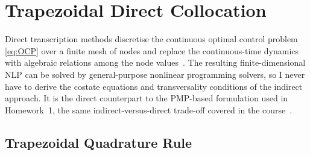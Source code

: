 \documentclass[../main.tex]{subfiles}
\begin{document}
\section{Trapezoidal Direct Collocation}\label{sec:methodology}

Direct transcription methods discretise the continuous optimal control problem \eqref{eq:OCP} over a finite mesh of nodes and replace the continuous-time dynamics with algebraic relations among the node values~\cite{betts2010}. The resulting finite-dimensional NLP can be solved by general-purpose nonlinear programming solvers, so I never have to derive the costate equations and transversality conditions of the indirect approach. It is the direct counterpart to the PMP-based formulation used in Homework~1, the same indirect-versus-direct trade-off covered in the course~\cite[Lecture~8]{dclvnotes}.

\subsection{Trapezoidal Quadrature Rule}\label{sec:trap_rule}
\end{document}

